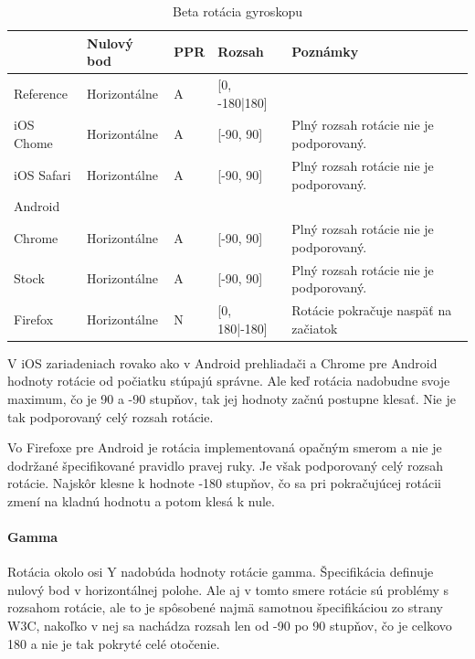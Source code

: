 \begin{table}[H]
  \begin{tabular}{ | l | l | l | l | l |}
  \hline
              & Nulový bod    & PPR   & Rozsah         & Poznámky\\ \hline
  Reference   & Horizontálne   & A     & [0, -180|180] & \\  
  iOS Chome   & Horizontálne   & A     & [-90, 90]     & Plný rozsah rotácie nie je podporovaný. \\  
  iOS Safari  & Horizontálne   & A     & [-90, 90]     & Plný rozsah rotácie nie je podporovaný. \\  
  Android & & & & \\  
  Chrome      & Horizontálne   & A     & [-90, 90]     & Plný rozsah rotácie nie je podporovaný. \\  
  Stock       & Horizontálne   & A     & [-90, 90]     & Plný rozsah rotácie nie je podporovaný. \\  
  Firefox     & Horizontálne   & N     & [0, 180|-180] & Rotácie pokračuje naspäť na začiatok \\
  \hline
  \end{tabular}
  \caption[Beta rotácia gyroskopu]{Beta rotácia gyroskopu}
\end{table}

V iOS zariadeniach rovako ako v Android prehliadači a Chrome pre Android hodnoty rotácie od počiatku stúpajú správne. Ale keď rotácia nadobudne svoje maximum, čo je 90 a -90 stupňov, tak jej hodnoty začnú postupne klesať. Nie je tak podporovaný celý rozsah rotácie.

Vo Firefoxe pre Android je rotácia implementovaná opačným smerom a nie je dodržané špecifikované pravidlo pravej ruky. Je však podporovaný celý rozsah rotácie. Najskôr klesne k hodnote -180 stupňov, čo sa pri pokračujúcej rotácii zmení na kladnú hodnotu a potom klesá k nule.



\paragraph{Gamma} %
\label{par:gamma}

Rotácia okolo osi Y nadobúda hodnoty rotácie gamma. Špecifikácia definuje nulový bod v horizontálnej polohe. Ale aj v tomto smere rotácie sú problémy s rozsahom rotácie, ale to je spôsobené najmä samotnou špecifikáciou zo strany W3C, nakoľko v nej sa nachádza rozsah len od -90 po 90 stupňov, čo je celkovo 180 a nie je tak pokryté celé otočenie.

